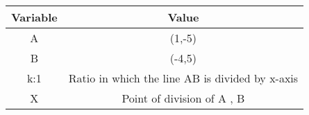 \begin{tabular}{|c| c |}
\hline
\textbf{Variable} & \textbf{Value} \\
\hline
A & (1,-5)\\
\hline
B & (-4,5)\\
\hline
k:1    & Ratio in which the line AB is divided by x-axis \\
\hline
X  & Point of division of A , B\\
\hline
\end{tabular} 
